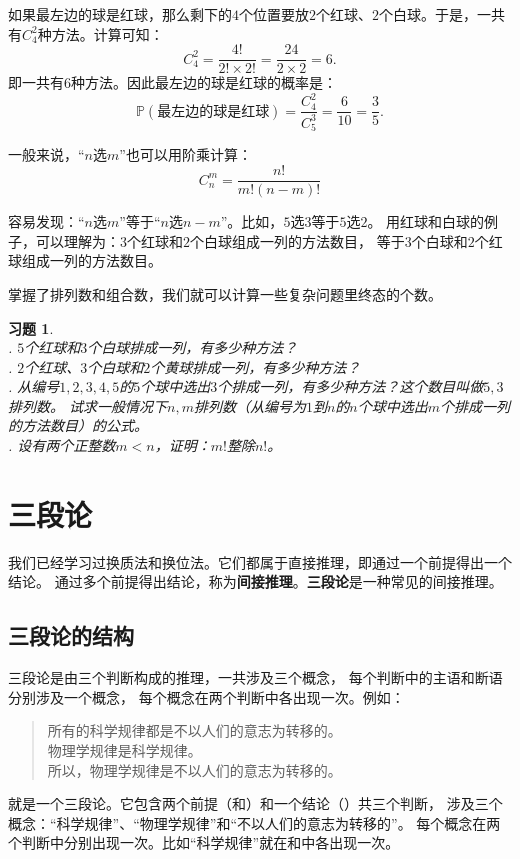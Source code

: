\documentclass[12pt,UTF8]{ctexbook}
\newtheorem{xt}{习题}[section]
\begin{document}
如果最左边的球是红球，那么剩下的$4$个位置要放$2$个红球、$2$个白球。于是，一共有$C_4^2$种方法。计算可知：
$$ C_4^2 = \frac{4!}{2!\times 2!} = \frac{24}{2\times 2} = 6.$$
即一共有$6$种方法。因此最左边的球是红球的概率是：
$$ \mathbb{P}(\mbox{最左边的球是红球}) = \frac{C_4^2}{C_5^3} = \frac{6}{10} = \frac{3}{5}.$$

一般来说，“$n$选$m$”也可以用阶乘计算：
$$ C_n^m = \frac{n!}{m!(n-m)!} $$

容易发现：“$n$选$m$”等于“$n$选$n-m$”。比如，$5$选$3$等于$5$选$2$。
用红球和白球的例子，可以理解为：$3$个红球和$2$个白球组成一列的方法数目，
等于$3$个白球和$2$个红球组成一列的方法数目。

掌握了排列数和组合数，我们就可以计算一些复杂问题里终态的个数。

\begin{xt}
    \mbox{} \\
    . $5$个红球和$3$个白球排成一列，有多少种方法？\\
    . $2$个红球、$3$个白球和$2$个黄球排成一列，有多少种方法？\\
    . 从编号$1,2,3,4,5$的$5$个球中选出$3$个排成一列，有多少种方法？这个数目叫做$5,3$排列数。
    试求一般情况下$n,m$排列数（从编号为$1$到$n$的$n$个球中选出$m$个排成一列的方法数目）的公式。\\
    . 设有两个正整数$m < n$，证明：$m!$整除$n!$。
\end{xt}

\chapter{三段论}

我们已经学习过换质法和换位法。它们都属于直接推理，即通过一个前提得出一个结论。
通过多个前提得出结论，称为\textbf{间接推理}。\textbf{三段论}是一种常见的间接推理。

\section{三段论的结构}
三段论是由三个判断构成的推理，一共涉及三个概念，
每个判断中的主语和断语分别涉及一个概念，
每个概念在两个判断中各出现一次。例如：
\begin{quotation}
    \noindent {}所有的科学规律都是不以人们的意志为转移的。\\
    物理学规律是科学规律。\\
    所以，物理学规律是不以人们的意志为转移的。
\end{quotation}
就是一个三段论。它包含两个前提（和）和一个结论（）共三个判断，
涉及三个概念：“科学规律”、“物理学规律”和“不以人们的意志为转移的”。
每个概念在两个判断中分别出现一次。比如“科学规律”就在和中各出现一次。
\end{document}

